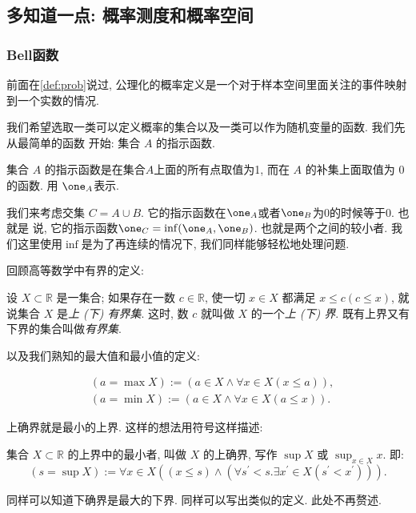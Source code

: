
\subsection*{多知道一点: 概率测度和概率空间}

\subsubsection*{Bell函数}

前面在\cref{def:prob}说过, 公理化的概率定义是一个对于样本空间里面关注的事件映射到一个实数的情况. 

我们希望选取一类可以定义概率的集合以及一类可以作为随机变量的函数. 我们先从最简单的函数
开始: 集合 $A$ 的指示函数.

\begin{definition*}
    集合 $A$ 的指示函数是在集合$A$上面的所有点取值为1, 而在 $A$ 的补集上面取值为
    0的函数. 用 $\one_A$表示.
\end{definition*}

我们来考虑交集 $C=A\cup B$. 它的指示函数在$\one_A$或者$\one_B$为0的时候等于0. 也就是
说, 它的指示函数$\one_C=\inf(\one_A, \one_B)$. 也就是两个之间的较小者. 我们这里使用$\inf$是为了再连续的情况下, 我们同样能够轻松地处理问题. 

\begin{asidebox}
    回顾高等数学中有界的定义: 
    \begin{definition*}
        设 $X \subset \mathbb{R}$ 是一集合; 如果存在一数 $c \in \mathbb{R}$, 使一切 $x \in X$ 都满足 $x \leqslant c(c \leqslant x)$, 就说集合 $X$ 是\emph{上 (下) 有界集}.
    这时, 数 $c$ 就叫做 $X$ 的一个\emph{上 (下) 界}.
    既有上界又有下界的集合叫做\emph{有界集}.
    \end{definition*}


    以及我们熟知的最大值和最小值的定义: 
    \begin{definition*}
        $$\begin{aligned} & (a=\max X):=(a \in X \wedge \forall x \in X(x \leqslant a)), \\ & (a=\min X):=(a \in X \wedge \forall x \in X(a \leqslant x)) .\end{aligned}$$
    \end{definition*}

    上确界就是最小的上界. 这样的想法用符号这样描述: 
    \begin{definition*}
         集合 $X \subset \mathbb{R}$ 的上界中的最小者, 叫做 $X$ 的上确界, 写作 $\sup X$ 或 $\sup _{x \in X} x$. 即: $$(s=\sup X):=\forall x \in X\left((x \leqslant s) \wedge\left(\forall s^{\prime}<s. \exists x^{\prime} \in X\left(s^{\prime}<x^{\prime}\right)\right)\right).$$
    \end{definition*}

    同样可以知道下确界是最大的下界. 同样可以写出类似的定义. 此处不再赘述.
\end{asidebox}


